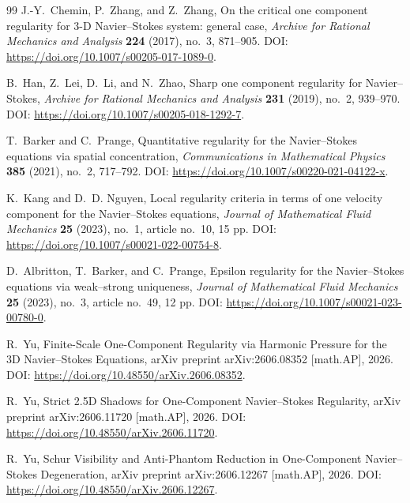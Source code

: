 \documentclass[11pt]{article}
\numberwithin{equation}{section}
\theoremstyle{plain}
\theoremstyle{definition}
\theoremstyle{remark}
\begin{document}
\begin{thebibliography}{99}
J.-Y.~Chemin, P.~Zhang, and Z.~Zhang,
\newblock On the critical one component regularity for 3-D Navier--Stokes system: general case,
\newblock \emph{Archive for Rational Mechanics and Analysis} \textbf{224} (2017), no.~3, 871--905.
\newblock DOI: \url{https://doi.org/10.1007/s00205-017-1089-0}.

B.~Han, Z.~Lei, D.~Li, and N.~Zhao,
\newblock Sharp one component regularity for Navier--Stokes,
\newblock \emph{Archive for Rational Mechanics and Analysis} \textbf{231} (2019), no.~2, 939--970.
\newblock DOI: \url{https://doi.org/10.1007/s00205-018-1292-7}.

T.~Barker and C.~Prange,
\newblock Quantitative regularity for the Navier--Stokes equations via spatial concentration,
\newblock \emph{Communications in Mathematical Physics} \textbf{385} (2021), no.~2, 717--792.
\newblock DOI: \url{https://doi.org/10.1007/s00220-021-04122-x}.

K.~Kang and D.~D. Nguyen,
\newblock Local regularity criteria in terms of one velocity component for the Navier--Stokes equations,
\newblock \emph{Journal of Mathematical Fluid Mechanics} \textbf{25} (2023), no.~1, article no.~10, 15 pp.
\newblock DOI: \url{https://doi.org/10.1007/s00021-022-00754-8}.

D.~Albritton, T.~Barker, and C.~Prange,
\newblock Epsilon regularity for the Navier--Stokes equations via weak--strong uniqueness,
\newblock \emph{Journal of Mathematical Fluid Mechanics} \textbf{25} (2023), no.~3, article no.~49, 12 pp.
\newblock DOI: \url{https://doi.org/10.1007/s00021-023-00780-0}.

R.~Yu,
\newblock Finite-Scale One-Component Regularity via Harmonic Pressure for the 3D Navier--Stokes Equations,
\newblock arXiv preprint arXiv:2606.08352 [math.AP], 2026.
\newblock DOI: \url{https://doi.org/10.48550/arXiv.2606.08352}.

R.~Yu,
\newblock Strict 2.5D Shadows for One-Component Navier--Stokes Regularity,
\newblock arXiv preprint arXiv:2606.11720 [math.AP], 2026.
\newblock DOI: \url{https://doi.org/10.48550/arXiv.2606.11720}.

R.~Yu,
\newblock Schur Visibility and Anti-Phantom Reduction in One-Component Navier--Stokes Degeneration,
\newblock arXiv preprint arXiv:2606.12267 [math.AP], 2026.
\newblock DOI: \url{https://doi.org/10.48550/arXiv.2606.12267}.


\end{thebibliography}
\end{document}
